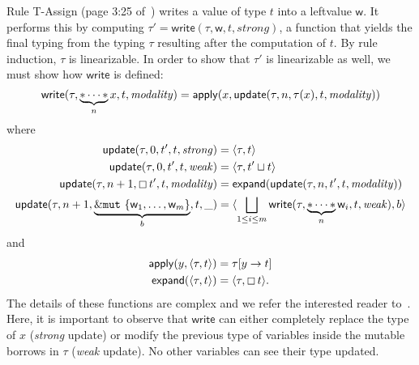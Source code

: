 Rule \textsf{T-Assign} (page 3:25 of~\cite{Pearce21}) writes a value of type
$t$ into a leftvalue $\mathsf{w}$.
It performs this by computing $\tau'=\mathsf{write}(\tau,\mathsf{w},t,\mathit{strong})$,
a function that yields the final typing from the typing $\tau$ resulting after the computation of $t$.
By rule induction, $\tau$ is linearizable. In order to show that $\tau'$ is linearizable as well,
we must show how $\mathsf{write}$ is defined:
\[
\mathsf{write}(\tau,\underbrace{\mathtt{*}\cdots\mathtt{*}}_nx,t,\mathit{modality})=\mathsf{apply}
(x,\mathsf{update}(\tau,n,\tau(x),t,\mathit{modality}))
\]
where
\begin{align*}
  \mathsf{update}(\tau,0,t',t,\mathit{strong})&=\langle\tau,t\rangle\\
  \mathsf{update}(\tau,0,t',t,\mathit{weak})&=\langle\tau,t'\sqcup t\rangle\\
  \mathsf{update}(\tau,n+1,\boxempty\,{t'},t,\mathit{modality})
  &=\mathsf{expand}(\mathsf{update}(\tau,n,t',t,\mathit{modality}))\\
  \mathsf{update}(\tau,n+1,\underbrace{\&\mathtt{mut}\ \{\mathsf{w}_1,\ldots,\mathsf{w}_m\}}_b,t,\_)&=
    \langle\bigsqcup\limits_{1\le i\le m}\mathsf{write}(\tau,\underbrace{\mathtt{*}\cdots\mathtt{*}}_n\mathsf{w}_i,t,\mathit{weak}),b\rangle
\end{align*}
and
\begin{align*}
  \mathsf{apply}(y,\langle\tau,t\rangle)&=\tau[y\to t]\\
  \mathsf{expand}(\langle\tau,t\rangle)&=\langle\tau,\boxempty\,{t}\rangle.
\end{align*}
%
The details of these functions
are complex and we refer the interested reader to~\cite{Pearce21}.
Here, it is important to observe that $\mathsf{write}$
can either completely replace the type of $x$
(\emph{strong} update) or modify the previous type of variables
inside the mutable borrows in $\tau$ (\emph{weak} update).
No other variables can see their type updated.

